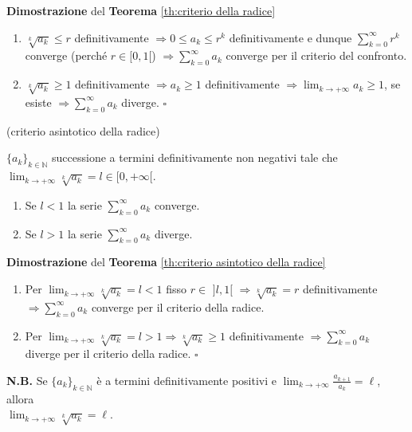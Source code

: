 \begin{dembar}
	\textbf{Dimostrazione} del \textbf{Teorema} \ref{th:criterio della radice} 
	
	\begin{enumerate}
		\item $\sqrt[k]{a_k}\leq r$ definitivamente $\Rightarrow 0 \leq a_k \leq r^k$ definitivamente e dunque $\sum_{k=0}^{\infty} r^k$ converge (perché $r \in [0,1[$) $\Rightarrow \sum_{k=0}^{\infty} a_k$ converge per il criterio del confronto.
		
		\item $\sqrt[k]{a_k} \geq 1$ definitivamente $\Rightarrow a_k \geq 1$ definitivamente $\Rightarrow \lim_{k \rightarrow + \infty} a_k \geq 1$, se esiste $\Rightarrow \sum_{k=0}^{\infty} a_k$ diverge. $\square$ 
	\end{enumerate}
\end{dembar}


\begin{theorem} (criterio asintotico della radice) 
	
	\label{th:criterio asintotico della radice}
	$\{a_k\}_{k \in \mathbb{N}}$ successione a termini definitivamente non negativi tale che $\lim_{k \rightarrow +\infty} \sqrt[k]{a_k} = l \in [0,+\infty[$.
	\begin{enumerate}
		\item Se $l<1$ la serie $ \sum_{k=0}^{\infty} a_k$ converge.
		\item Se $l> 1$ la serie $\sum_{k=0}^{\infty} a_k$ diverge.
	\end{enumerate}
\end{theorem}


\begin{dembar}
	\textbf{Dimostrazione} del \textbf{Teorema} \ref{th:criterio asintotico della radice} 
	\begin{enumerate}
		\item Per $\lim_{k \rightarrow +\infty} \sqrt[k]{a_k} = l < 1$ fisso $r\in \,\,]l,1[\,\, \Rightarrow \sqrt[k]{a_k} =r$  definitivamente $\Rightarrow \sum_{k=0}^{\infty} a_k$ converge per il criterio della radice.
		\item Per $\lim_{k \rightarrow +\infty} \sqrt[k]{a_k} = l > 1 \Rightarrow \sqrt[k]{a_k}\geq 1$ definitivamente  $\Rightarrow \sum_{k=0}^{\infty} a_k$ diverge per il criterio della radice. $\square$
	\end{enumerate}
\end{dembar}


\begin{attbar}
	\textbf{N.B.} Se $\{a_k\}_{k \in \mathbb{N}}$ è a termini definitivamente positivi e  $\lim_{k \rightarrow +\infty} \frac{a_{k+1}}{a_k} = \ell$, allora \\ $\lim_{k \rightarrow +\infty} \sqrt[k]{a_k} = \ell$.
\end{attbar}


